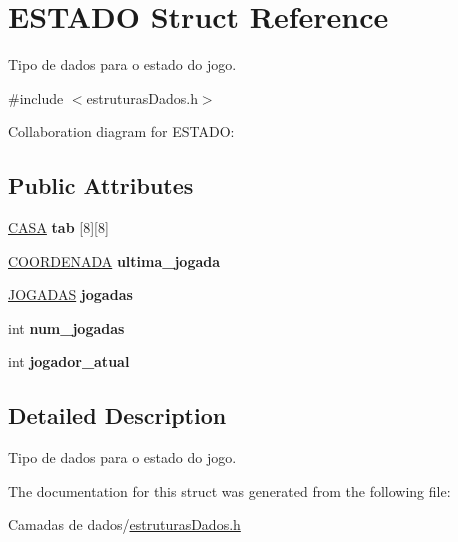 \hypertarget{structESTADO}{}\section{E\+S\+T\+A\+DO Struct Reference}
\label{structESTADO}


Tipo de dados para o estado do jogo.  




{\ttfamily \#include $<$estruturas\+Dados.\+h$>$}



Collaboration diagram for E\+S\+T\+A\+DO\+:
\subsection*{Public Attributes}
\begin{DoxyCompactItemize}
\item 
\mbox{\label{structESTADO_ab56f0f1be16954d3768b4174d14c087d}} 
\hyperlink{estruturasDados_8h_aba91601f16d4c485b2d9b8c429f27039}{C\+A\+SA} {\bfseries tab} \mbox{[}8\mbox{]}\mbox{[}8\mbox{]}
\item 
\mbox{\label{structESTADO_a4896a5c5c1f40b43fb795623327e3f47}} 
\hyperlink{structCOORDENADA}{C\+O\+O\+R\+D\+E\+N\+A\+DA} {\bfseries ultima\+\_\+jogada}
\item 
\mbox{\label{structESTADO_afae43b87a488fad0f2b56a18bad31d18}} 
\hyperlink{estruturasDados_8h_a94c221d29a1760f008b7834093259b7d}{J\+O\+G\+A\+D\+AS} {\bfseries jogadas}
\item 
\mbox{\label{structESTADO_a261495728744647e618b4e623f5a4b7a}} 
int {\bfseries num\+\_\+jogadas}
\item 
\mbox{\label{structESTADO_a5dd28e2e68b7aef2b6b7ea88e02eff58}} 
int {\bfseries jogador\+\_\+atual}
\end{DoxyCompactItemize}


\subsection{Detailed Description}
Tipo de dados para o estado do jogo. 

The documentation for this struct was generated from the following file\+:\begin{DoxyCompactItemize}
\item 
Camadas de dados/\hyperlink{estruturasDados_8h}{estruturas\+Dados.\+h}\end{DoxyCompactItemize}
